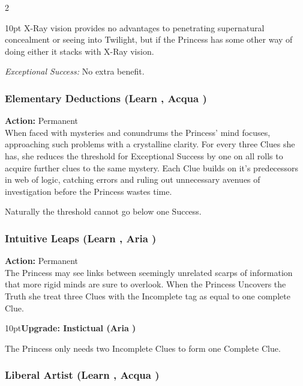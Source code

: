 \begin{multicols}{2}
\begin{myindentpar}{10pt}
	X-Ray vision provides no advantages to penetrating supernatural concealment or seeing into Twilight, but if the Princess has some other way of doing either it stacks with X-Ray vision.

    \emph{Exceptional Success:}  No extra benefit.\end{myindentpar}

\subsubsection*{Elementary Deductions (Learn \textbullet, Acqua \textbullet\textbullet)}

\noindent \textbf{Action:} Permanent \\

\noindent When faced with mysteries and conundrums the Princess' mind focuses, approaching such problems with a crystalline clarity. For every three Clues she has, she reduces the threshold for Exceptional Success by one on all rolls to acquire further clues to the same mystery. Each Clue builds on it's predecessors in web of logic, catching errors and ruling out unnecessary avenues of investigation before the Princess wastes time.

Naturally the threshold cannot go below one Success. 

\subsubsection*{Intuitive Leaps (Learn \textbullet, Aria \textbullet\textbullet)}

\noindent \textbf{Action:} Permanent \\

\noindent The Princess may see links between seemingly unrelated scarps of information that more rigid minds are sure to overlook. When the Princess Uncovers the Truth she treat three Clues with the Incomplete tag as equal to one complete Clue. 

\begin{myindentpar}{10pt}\textbf{Upgrade: Instictual (Aria \textbullet\textbullet\textbullet\textbullet)}

The Princess only needs two Incomplete Clues to form one Complete Clue. 

\end{myindentpar}

\subsubsection*{Liberal Artist (Learn \textbullet, Acqua \textbullet)}


\end{multicols}
